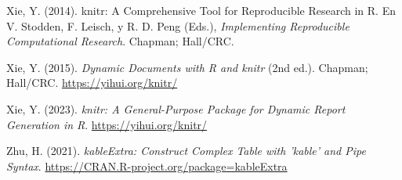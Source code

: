 \documentclass[spanish]{article}
\newlength{\cslhangindent}
\newlength{\cslentryspacingunit} %
\newenvironment{CSLReferences}[2] %
 {%
  \setlength{\parindent}{0pt}
  \ifodd #1
  \let\oldpar\par
  \def\par{\hangindent=\cslhangindent\oldpar}
  \fi
  \setlength{\parskip}{#2\cslentryspacingunit}
 }%
 {}
\begin{document}
\begin{CSLReferences}{1}{0}
\leavevmode{}%
Xie, Y. (2014). knitr: A Comprehensive Tool for Reproducible Research in
{R}. En V. Stodden, F. Leisch, y R. D. Peng (Eds.), \emph{Implementing
Reproducible Computational Research}. Chapman; Hall/CRC.

\leavevmode{}%
Xie, Y. (2015). \emph{Dynamic Documents with {R} and knitr} (2nd ed.).
Chapman; Hall/CRC. \url{https://yihui.org/knitr/}

\leavevmode{}%
Xie, Y. (2023). \emph{knitr: A General-Purpose Package for Dynamic
Report Generation in R}. \url{https://yihui.org/knitr/}

\leavevmode{}%
Zhu, H. (2021). \emph{kableExtra: Construct Complex Table with 'kable'
and Pipe Syntax}. \url{https://CRAN.R-project.org/package=kableExtra}

\end{CSLReferences}



\end{document}
